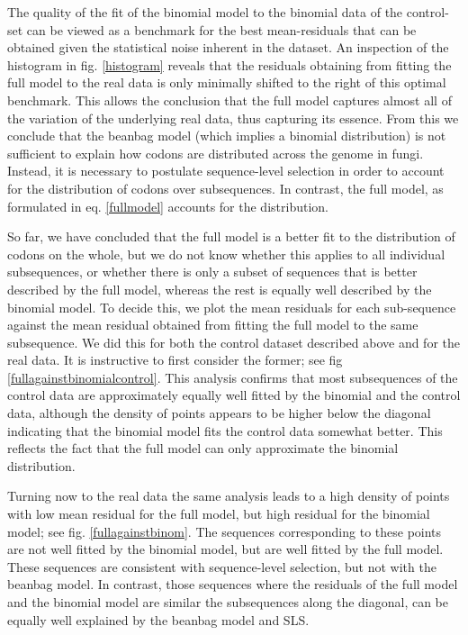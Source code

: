 \documentclass[a4paper,10pt]{paper}%
\begin{document}
\par
The quality of the   fit of the binomial model to the  binomial  data of the control-set can be viewed as a benchmark for the best mean-residuals that can be obtained given the statistical noise inherent in the dataset. An inspection of the histogram in fig. \ref{histogram} reveals  that the  residuals obtaining from fitting  the  full model to the real data is only minimally shifted to the right of this optimal benchmark. This allows the conclusion that the full model captures almost all of the variation of the underlying real data, thus capturing its essence. From this we conclude that  the beanbag model (which implies a binomial distribution) is not sufficient to explain  how codons are distributed across the genome in fungi. Instead, it  is necessary to postulate sequence-level selection in order to account for the distribution of codons over subsequences. In contrast, the full model, as formulated in eq. \ref{fullmodel} accounts for the distribution.  
\par
So far, we have concluded that  the full model is a better fit to the distribution of codons on the whole, but we do not know whether this applies to all  individual subsequences, or  whether  there is only a subset of sequences that is better described by the full model, whereas the rest is equally well described by the binomial model. To decide this, we plot the mean residuals for each sub-sequence against the  mean residual obtained from fitting  the full model to the same subsequence. We did this for both the control dataset described above and for the real data.  It is instructive to first consider  the former; see fig \ref{fullagainstbinomialcontrol}. This  analysis confirms  that  most subsequences  of the control data are approximately equally well fitted by the binomial and the control data, %
although the density of points appears to be higher below the diagonal indicating that the binomial model fits the control data somewhat better. This reflects the fact that the full model can only approximate the binomial distribution. 
\par
Turning now to the  real data  the same analysis leads to  a high density of points with low mean residual for the  full model, but high residual for the binomial model; see  fig. \ref{fullagainstbinom}.  The sequences corresponding to these points are not well fitted by the binomial model, but are well fitted by the full model. These sequences are  consistent with sequence-level selection, but not with the beanbag model. In contrast, those sequences where the residuals of the full model and the binomial model are similar  the subsequences along the diagonal,  can be equally well explained by the beanbag model and SLS.
\end{document}
